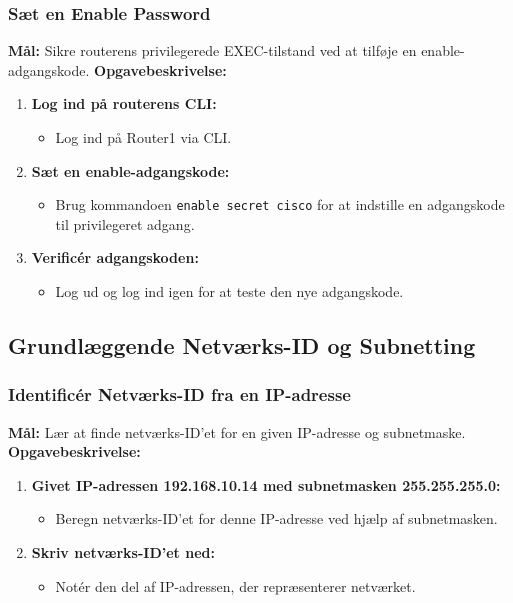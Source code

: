 \subsubsection*{Sæt en Enable Password}
\textbf{Mål:} Sikre routerens privilegerede EXEC-tilstand ved at tilføje en enable-adgangskode.
\newline\newline\noindent
\textbf{Opgavebeskrivelse:}
\begin{enumerate}
	\item \textbf{Log ind på routerens CLI:}
	\begin{itemize}
		\item Log ind på Router1 via CLI.
	\end{itemize}
	\item \textbf{Sæt en enable-adgangskode:}
	\begin{itemize}
		\item Brug kommandoen \texttt{enable secret cisco} for at indstille en adgangskode til privilegeret adgang.
	\end{itemize}
	\item \textbf{Verificér adgangskoden:}
	\begin{itemize}
		\item Log ud og log ind igen for at teste den nye adgangskode.
	\end{itemize}
\end{enumerate}

\subsection{Grundlæggende Netværks-ID og Subnetting}
\subsubsection*{Identificér Netværks-ID fra en IP-adresse}
\textbf{Mål:} Lær at finde netværks-ID'et for en given IP-adresse og subnetmaske.
\newline\newline\noindent
\textbf{Opgavebeskrivelse:}
\begin{enumerate}
	\item \textbf{Givet IP-adressen 192.168.10.14 med subnetmasken 255.255.255.0:}
	\begin{itemize}
		\item Beregn netværks-ID'et for denne IP-adresse ved hjælp af subnetmasken.
	\end{itemize}
	\item \textbf{Skriv netværks-ID'et ned:}
	\begin{itemize}
		\item Notér den del af IP-adressen, der repræsenterer netværket.
	\end{itemize}
\end{enumerate}

